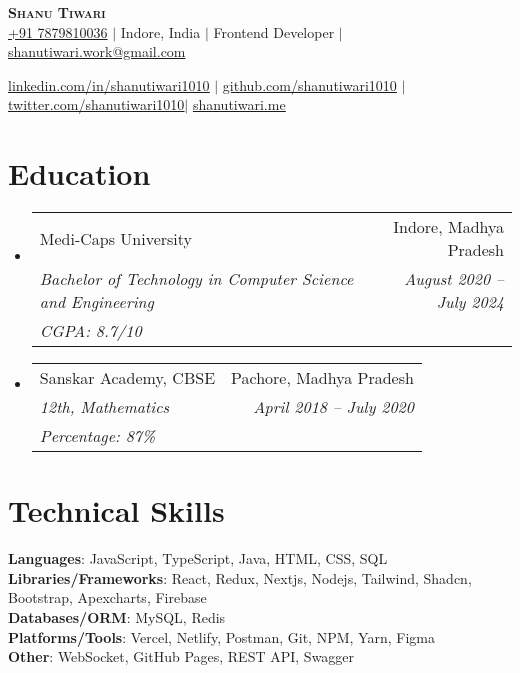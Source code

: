 \documentclass[letterpaper,11pt]{article}
\makeatletter
\newcommand{\resumeEduheading}[5]{
    \vspace{2pt}\item
      \begin{tabular*}{0.97\textwidth}[t]{l@{\extracolsep{\fill}}r}
        {#1} & #2 \\
        \textit{\small#3} & \textit{\small #4}\\
        \textit{\small#5} \\
      \end{tabular*}\vspace{-7pt}
  }
\newcommand{\resumeSubHeadingListStart}{\begin{itemize}[leftmargin=0.15in, label={}]}
\newcommand{\resumeSubHeadingListEnd}{\end{itemize}}
\makeatother
\begin{document}

\begin{center}
  \textbf{\Huge \scshape Shanu Tiwari} \\ \vspace{1pt}
  \href{tel:7879810036}{+91 7879810036} $|$
  {Indore, India} $|$
  {Frontend Developer} $|$
  \href{mailto:shanutiwari.work@gmail.com}{shanutiwari.work@gmail.com} \\ \vspace{1pt}

  \href{https://linkedin.com/in/shanutiwari1010}{\underline{linkedin.com/in/shanutiwari1010}} $|$
  \href{https://github.com/shanutiwari1010}{\underline{github.com/shanutiwari1010}} $|$
  \href{https://twitter.com/shanutiwari1010}{\underline{twitter.com/shanutiwari1010}}$|$
   \href{https://shanutiwari.me/}{\underline{shanutiwari.me}} 
  
\end{center}

\section{Education}
\resumeSubHeadingListStart
\resumeEduheading
{Medi-Caps University}{Indore, Madhya Pradesh}
{Bachelor of Technology in Computer Science and Engineering}{August 2020 -- July 2024}
{CGPA: 8.7/10}
\resumeEduheading
{Sanskar Academy, CBSE}{Pachore, Madhya Pradesh}
{12th, Mathematics}{April 2018 -- July 2020}
{Percentage: 87\%}
\resumeSubHeadingListEnd

\section{Technical Skills}
\begin{itemize}[leftmargin=0.15in, label={}]
  \small{\item{
        \textbf{Languages}{: \hfill JavaScript, TypeScript, Java, HTML, CSS, SQL \hfill} \\
        \vspace{3pt}\textbf{Libraries/Frameworks}{: \hfill React, Redux, Nextjs, Nodejs, Tailwind, Shadcn, Bootstrap, Apexcharts, Firebase \hfill} \\
        \vspace{3pt}\textbf{Databases/ORM}{: \hfill MySQL, Redis \hfill} \\
        \vspace{3pt}\textbf{Platforms/Tools}{: \hfill Vercel, Netlify, Postman, Git, NPM, Yarn, Figma \hfill} \\
        \vspace{3pt}\textbf{Other}{: \hfill WebSocket, GitHub Pages, REST API, Swagger \hfill} \\
        }}
\end{itemize}
\end{document}
